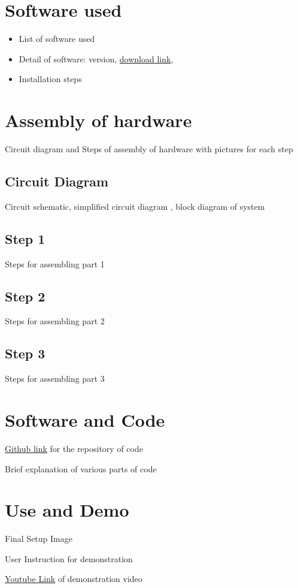 \documentclass[a4paper,12pt,oneside]{book}
\begin{document}
\section{Software used}
\begin{itemize}
  \item List of software used 
  \item Detail of software: version, \href{http://www.amazon.com}{download link}, 
  \item Installation steps
\end{itemize}

\section{Assembly of hardware}
Circuit diagram and Steps of assembly of hardware with pictures for each step
\subsection*{Circuit Diagram}
Circuit schematic, simplified circuit diagram , block diagram of system
\subsection*{Step 1}
Steps for assembling part 1
\subsection*{Step 2}
Steps for assembling part 2
\subsection*{Step 3}
Steps for assembling part 3



\section{Software and Code}
\href{http://www.github.com}{Github link} for the repository of code

Brief explanation of various parts of code 

\section{Use and Demo}
Final Setup Image

User Instruction for demonstration

\href{http://www.youtube.com}{Youtube Link} of demonstration video 
\end{document}
